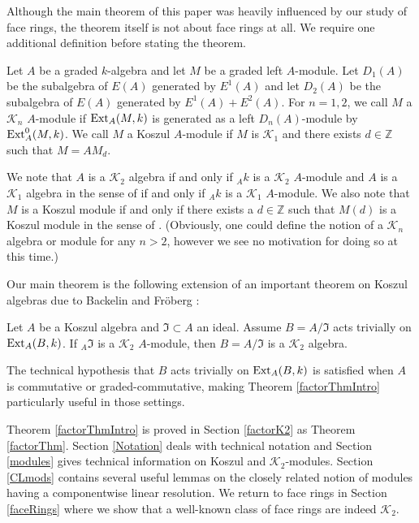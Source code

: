 \documentclass[11pt,righttag]{amsart}
\begin{document}
Although the main theorem of this paper was heavily influenced by our study of face rings, the theorem itself is not  about face rings at all.  We require one additional definition before stating the theorem.

\begin{defn}
Let $A$ be a graded $k$-algebra and let $M$ be a graded left $A$-module. Let  $D_1(A)$ be the subalgebra of $E(A)$ generated by $E^1(A)$ and let $D_2(A)$ be the subalgebra of $E(A)$ generated by $E^1(A)+E^2(A)$.  For $n=1, 2$, we call $M$ a ${{\mathcal K}}_n$ $A$-module if ${\hbox{{\rm Ext}}}_A(M,k)$ is generated as a left $D_n(A)$-module by ${\hbox{{\rm Ext}}}_A^0(M,k)$. We call $M$ a Koszul $A$-module if $M$ is ${{\mathcal K}}_1$ and there exists $d\in{{\mathbb Z}}$ such that $M=AM_d$.
\end{defn}

We note that $A$ is a ${{\mathcal K}}_2$ algebra if and only if $_Ak$ is a ${{\mathcal K}}_2$ $A$-module and  $A$ is a ${{\mathcal K}}_1$ algebra in the sense of \cite{PhanThesis} if and only if $_Ak$ is a ${{\mathcal K}}_1$ $A$-module. We also note that $M$ is a Koszul module if and only if there exists a $d\in{{\mathbb Z}}$ such that $M(d)$ is a Koszul module in the sense of \cite{PP}.
(Obviously, one could define the notion of a ${{\mathcal K}}_n$ algebra or module for any $n>2$, however we see no motivation for doing so at this time.)

Our main theorem is  the following extension of an important theorem on Koszul algebras due to Backelin and Fr\"{o}berg \cite{BackFro}:

 \begin{thm} 
  \label{factorThmIntro}
  Let $A$ be a Koszul algebra and ${\mathfrak{I}}\subset A$ an ideal. Assume $B=A/{\mathfrak{I}}$ acts trivially on ${\hbox{{\rm Ext}}}_A(B,k)$.
 If $_A{\mathfrak{I}}$ is a ${{\mathcal K}}_2$ $A$-module, then $B=A/{\mathfrak{I}}$ is a ${{\mathcal K}}_2$ algebra.
 \end{thm}
 
 The technical hypothesis that $B$ acts trivially on ${\hbox{{\rm Ext}}}_A(B,k)$ is satisfied when $A$ is commutative or graded-commutative, making Theorem \ref{factorThmIntro} particularly useful in those settings.  
 
Theorem \ref{factorThmIntro} is proved in Section \ref{factorK2} as Theorem \ref{factorThm}.  Section \ref{Notation} deals with technical notation and Section \ref{modules} gives technical information on Koszul and ${{\mathcal K}}_2$-modules. Section \ref{CLmods} contains several useful lemmas on the closely related notion of modules having a componentwise linear resolution.  We return to face rings in Section \ref{faceRings} where we show that a well-known class of face rings are indeed ${{\mathcal K}}_2$.
\end{document}

